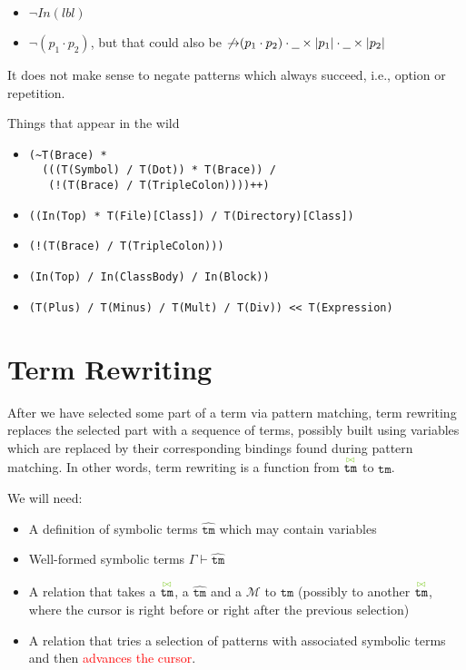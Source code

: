 \documentclass{article}
\newcommand{\RED}[1]{\textcolor{red}{#1}}
\newcommand{\cursorColor}{LimeGreen}
\newcommand{\lbl}{\ensuremath{\mathit{lbl}}}
\newcommand{\tm}{\ensuremath{\mathtt{tm}}}
\newcommand{\Tmc}{\ensuremath{\overset{ \textcolor{\cursorColor}{\bowtie}}{\tm}}}
\newcommand{\Tmx}{\ensuremath{\hat{\tm}}}
\newcommand{\bindings}{\ensuremath{\mathcal{M}}}
\newcommand{\pseq}[2]{\ensuremath{#1 \cdot #2}}
\newcommand{\any}{\ensuremath{\text{\underline{\hspace{0.6em}}}}}
\newcommand{\nfb}[1]{\ensuremath{\mathop{\not\rightarrow}(#1)}}
\newcommand{\pin}[1]{\ensuremath{\mathit{In}(#1)}}
\begin{document}
\begin{itemize}
\item $\lnot \pin{\lbl}$
\item $\lnot (\pseq{p_1}{p_2})$, but that could also be
  $\pseq{\nfb{\pseq{p_1}{p_2}}}{\pseq{\any\times|p_1|}{\any\times|p_2|}}$
\end{itemize}
%
It does not make sense to negate patterns which always succeed,
i.e., option or repetition.

Things that appear in the wild
\begin{itemize}
\item
\begin{verbatim}
(~T(Brace) *
  (((T(Symbol) / T(Dot)) * T(Brace)) /
   (!(T(Brace) / T(TripleColon))))++)
\end{verbatim}
\item \texttt{((In(Top) * T(File)[Class]) / T(Directory)[Class])}
\item \texttt{(!(T(Brace) / T(TripleColon)))}
\item \texttt{(In(Top) / In(ClassBody) / In(Block))}
\item
\begin{verbatim}
(T(Plus) / T(Minus) / T(Mult) / T(Div)) << T(Expression)
\end{verbatim}
\end{itemize}

\section{Term Rewriting}

After we have selected some part of a term via pattern matching,
term rewriting replaces the selected part with a sequence of
terms, possibly built using variables which are replaced by their
corresponding bindings found during pattern matching. In other
words, term rewriting is a function from $\Tmc$ to $\tm$.

We will need:

\begin{itemize}
\item A definition of symbolic terms $\Tmx$ which may contain variables
\item Well-formed symbolic terms $\Gamma \vdash \Tmx$
\item A relation that takes a $\Tmc$, a $\Tmx$ and a $\bindings$
  to $\tm$ (possibly to another $\Tmc$, where the cursor is right
  before or right after the previous selection)
\item A relation that tries a selection of patterns with
  associated symbolic terms and then \RED{advances the cursor}.
\end{itemize}
\end{document}

